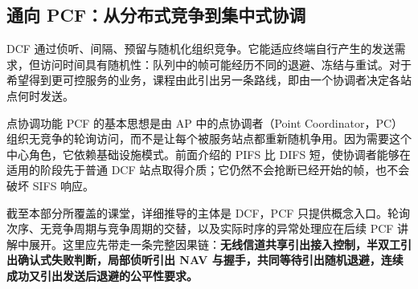 \subsection{通向 PCF：从分布式竞争到集中式协调}

DCF 通过侦听、间隔、预留与随机化组织竞争。它能适应终端自行产生的发送需求，但访问时间具有随机性：队列中的帧可能经历不同的退避、冻结与重试。对于希望得到更可控服务的业务，课程由此引出另一条路线，即由一个协调者决定各站点何时发送。

点协调功能 PCF 的基本思想是由 AP 中的点协调者（Point Coordinator，PC）组织无竞争的轮询访问，而不是让每个被服务站点都重新随机争用。因为需要这个中心角色，它依赖基础设施模式。前面介绍的 PIFS 比 DIFS 短，使协调者能够在适用的阶段先于普通 DCF 站点取得介质；它仍然不会抢断已经开始的帧，也不会破坏 SIFS 响应。

截至本部分所覆盖的课堂，详细推导的主体是 DCF，PCF 只提供概念入口。轮询次序、无竞争周期与竞争周期的交替，以及实际时序的异常处理应在后续 PCF 讲解中展开。这里应先带走一条完整因果链：\textbf{无线信道共享引出接入控制，半双工引出确认式失败判断，局部侦听引出 NAV 与握手，共同等待引出随机退避，连续成功又引出发送后退避的公平性要求。}
